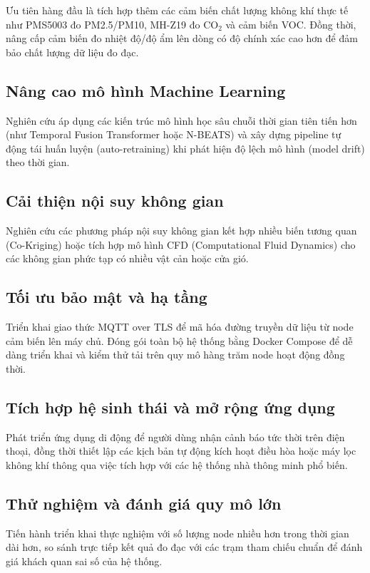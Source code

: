 Ưu tiên hàng đầu là tích hợp thêm các cảm biến chất lượng không khí thực tế như PMS5003 đo PM2.5/PM10, MH-Z19 đo CO$_2$ và cảm biến VOC. Đồng thời, nâng cấp cảm biến đo nhiệt độ/độ ẩm lên dòng có độ chính xác cao hơn để đảm bảo chất lượng dữ liệu đo đạc.

\subsection{Nâng cao mô hình Machine Learning}
\label{subsec:future:ml}

Nghiên cứu áp dụng các kiến trúc mô hình học sâu chuỗi thời gian tiên tiến hơn (như Temporal Fusion Transformer hoặc N-BEATS) và xây dựng pipeline tự động tái huấn luyện (auto-retraining) khi phát hiện độ lệch mô hình (model drift) theo thời gian.

\subsection{Cải thiện nội suy không gian}
\label{subsec:future:spatial}

Nghiên cứu các phương pháp nội suy không gian kết hợp nhiều biến tương quan (Co-Kriging) hoặc tích hợp mô hình CFD (Computational Fluid Dynamics) cho các không gian phức tạp có nhiều vật cản hoặc cửa gió.

\subsection{Tối ưu bảo mật và hạ tầng}
\label{subsec:future:infra}

Triển khai giao thức MQTT over TLS để mã hóa đường truyền dữ liệu từ node cảm biến lên máy chủ. Đóng gói toàn bộ hệ thống bằng Docker Compose để dễ dàng triển khai và kiểm thử tải trên quy mô hàng trăm node hoạt động đồng thời.

\subsection{Tích hợp hệ sinh thái và mở rộng ứng dụng}
\label{subsec:future:integration}

Phát triển ứng dụng di động để người dùng nhận cảnh báo tức thời trên điện thoại, đồng thời thiết lập các kịch bản tự động kích hoạt điều hòa hoặc máy lọc không khí thông qua việc tích hợp với các hệ thống nhà thông minh phổ biến.

\subsection{Thử nghiệm và đánh giá quy mô lớn}
\label{subsec:future:evaluation}

Tiến hành triển khai thực nghiệm với số lượng node nhiều hơn trong thời gian dài hơn, so sánh trực tiếp kết quả đo đạc với các trạm tham chiếu chuẩn để đánh giá khách quan sai số của hệ thống.
